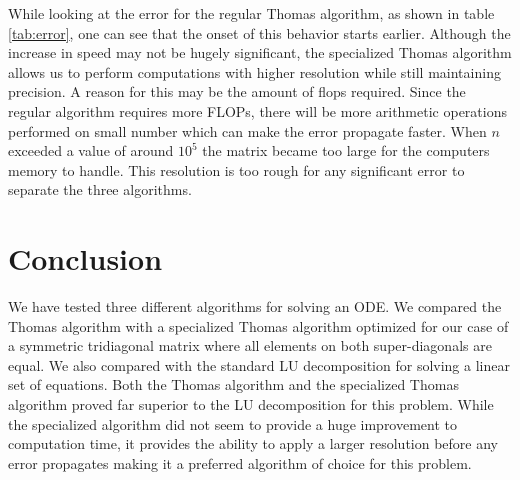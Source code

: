 \documentclass[twocolumn]{aastex62}
\begin{document}
While looking at the error for the regular Thomas algorithm, as shown in table \ref{tab:error}, one can see that the onset of this behavior starts earlier. Although the increase in speed may not be hugely significant, the specialized Thomas algorithm allows us to perform computations with higher resolution while still maintaining precision. A reason for this may be the amount of flops required. Since the regular algorithm requires more FLOPs, there will be more arithmetic operations performed on small number which can make the error propagate faster. When $n$ exceeded a value of around $10^5$ the matrix became too large for the computers memory to handle. This resolution is too rough for any significant error to separate the three algorithms.



\section{Conclusion} \label{sec:conclusion}
We have tested three different algorithms for solving an ODE. We compared the Thomas algorithm with a specialized Thomas algorithm optimized for our case of a symmetric tridiagonal matrix where all elements on both super-diagonals are equal. We also compared with the standard LU decomposition for solving a linear set of equations. Both the Thomas algorithm and the specialized Thomas algorithm proved far superior to the LU decomposition for this problem. While the specialized algorithm did not seem to provide a huge improvement to computation time, it provides the ability to apply a larger resolution before any error propagates making it a preferred algorithm of choice for this problem.




\end{document}
